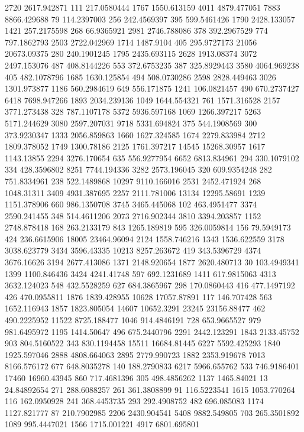 2720	2617.942871
111	217.0580444
1767	1550.613159
4011	4879.477051
7883	8866.429688
79	114.2397003
256	242.4569397
395	599.5461426
1790	2428.133057
1421	257.2175598
268	66.9365921
2981	2746.788086
378	392.2967529
774	797.1862793
2503	2722.042969
1714	1487.9104
405	295.9727173
21056	20673.09375
280	240.1901245
1795	2435.693115
2628	1913.08374
3072	2497.153076
487	408.8144226
553	372.6753235
387	325.8929443
3580	4064.969238
405	482.1078796
1685	1630.125854
494	508.0730286
2598	2828.449463
3026	1301.973877
1186	560.2984619
649	556.171875
1241	106.0821457
490	670.2737427
6418	7698.947266
1893	2034.239136
1049	1644.554321
761	1571.316528
2157	3771.273438
328	787.1107178
5372	5936.597168
1069	1266.397217
5263	5171.244629
3080	2597.207031
9718	5331.694824
375	544.1908569
300	373.9230347
1333	2056.859863
1660	1627.324585
1674	2279.833984
2712	1809.378052
1749	1300.78186
2125	1761.397217
14545	15268.30957
1617	1143.13855
2294	3276.170654
635	556.9277954
6652	6813.834961
294	330.1079102
334	428.3596802
8251	7744.194336
3282	2573.196045
320	609.9354248
282	751.8334961
238	522.1489868
10297	9110.166016
2531	2452.471924
268	1048.31311
3409	4931.387695
2257	2111.781006
13134	12295.58691
1239	1151.378906
660	986.1350708
3745	3465.445068
102	463.4951477
3374	2590.241455
348	514.4611206
2073	2716.902344
3810	3394.203857
1152	2748.878418
168	263.2133179
843	1265.189819
595	326.0059814
156	79.5949173
424	236.6615906
18005	23464.96094
2124	1558.746216
1343	1536.622559
3178	3038.623779
3434	3596.43335
10213	8257.263672
419	343.5396729
4374	3676.16626
3194	2677.413086
1371	2148.920654
1877	2620.480713
30	103.4949341
1399	1100.846436
3424	4241.41748
597	692.1231689
1411	617.9815063
4313	3632.124023
548	432.5528259
627	684.3865967
298	170.0860443
416	477.1497192
426	470.0955811
1876	1839.428955
10628	17057.87891
117	146.707428
563	1652.116943
1857	1823.805054
14607	10652.3291
23245	23156.88477
462	490.2225952
11522	8725.188477
1046	914.4846191
728	653.9665527
979	981.6495972
1195	1414.50647
496	675.2440796
2291	2442.123291
1843	2133.45752
903	804.5160522
343	830.1194458
15511	16684.81445
6227	5592.425293
1840	1925.597046
2888	4808.664063
2895	2779.990723
1882	2353.919678
7013	8166.576172
677	648.8035278
140	188.2790833
6217	5966.655762
533	746.9186401
17460	16960.43945
860	717.4681396
305	498.4856262
1137	1465.84021
13	24.84892654
271	288.6088257
261	361.3808899
91	116.5223541
1615	1053.770264
116	162.0950928
241	368.4453735
293	292.4908752
482	696.085083
1174	1127.821777
87	210.7902985
2206	2430.904541
5408	9882.549805
703	265.3501892
1089	995.4447021
1566	1715.001221
4917	6801.695801
